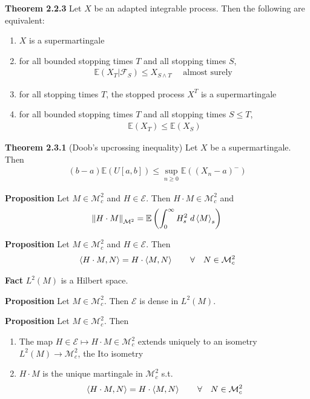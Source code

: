 \documentclass[hidelinks, 12pt]{article}
\theoremstyle{mydefstyle}
\theoremstyle{mythmstyle}
\begin{document}
\textbf{Theorem 2.2.3} Let $X$ be an adapted integrable process. Then the following are equivalent:
\begin{enumerate}[label = (\alph*)]
\item $X$ is a supermartingale
\item for all bounded stopping times $T$ and all stopping times $S$, 
\begin{gather*}
\mathbb{E}(X_T \vert \mathcal{F}_S) \le X_{S \wedge T} \quad\mbox{ almost surely }
\end{gather*}
\item for all stopping times $T$, the stopped process $X^T$ is a supermartingale
\item for all bounded stopping times $T$ and all stopping times $S \le T$,
\begin{gather*}
\mathbb{E}(X_T) \le \mathbb{E}(X_S)
\end{gather*}
\end{enumerate}

\textbf{Theorem 2.3.1} (Doob's upcrossing inequality) Let $X$ be a supermartingale. Then
\begin{gather*}
(b - a) \mathbb{E}(U[a, b]) \le \sup_{n \ge 0} \mathbb{E} \left( (X_n - a)^- \right)
\end{gather*}

\textbf{Proposition} Let $M \in \mathcal{M}^2_c$ and $H \in \mathcal{E}$. Then $H \cdot M \in \mathcal{M}^2_c$ and 
\begin{gather*}
\norm{H \cdot M}_{\mathcal{M}^2} = \mathbb{E} \left( \int_0^{\infty} H_s^2 \hspace{1mm} d\braket{M}_s \right)
\end{gather*}

\textbf{Proposition} Let $M \in \mathcal{M}^2_c$ and $H \in \mathcal{E}$. Then
\begin{gather*}
\braket{H \cdot M, N} = H \cdot \braket{M, N} \qquad \forall \quad N \in \mathcal{M}^2_c
\end{gather*}

\textbf{Fact} $L^2(M)$ is a Hilbert space.

\textbf{Proposition} Let $M \in \mathcal{M}^2_c$. Then $\mathcal{E}$ is dense in $L^2(M)$.

\textbf{Proposition} Let $M \in \mathcal{M}^2_c$. Then
\begin{enumerate}[label = (\roman*)]
\item The map $H \in \mathcal{E} \mapsto H \cdot M \in \mathcal{M}^2_c$ extends uniquely to an isometry $L^2(M) \to \mathcal{M}^2_c$, the Ito isometry
\item $H \cdot M$ is the unique martingale in $\mathcal{M}^2_c$ s.t.
\begin{gather*}
\braket{H \cdot M, N} = H \cdot \braket{M, N} \qquad \forall \quad N \in \mathcal{M}^2_c
\end{gather*}
\end{enumerate}
\end{document}

